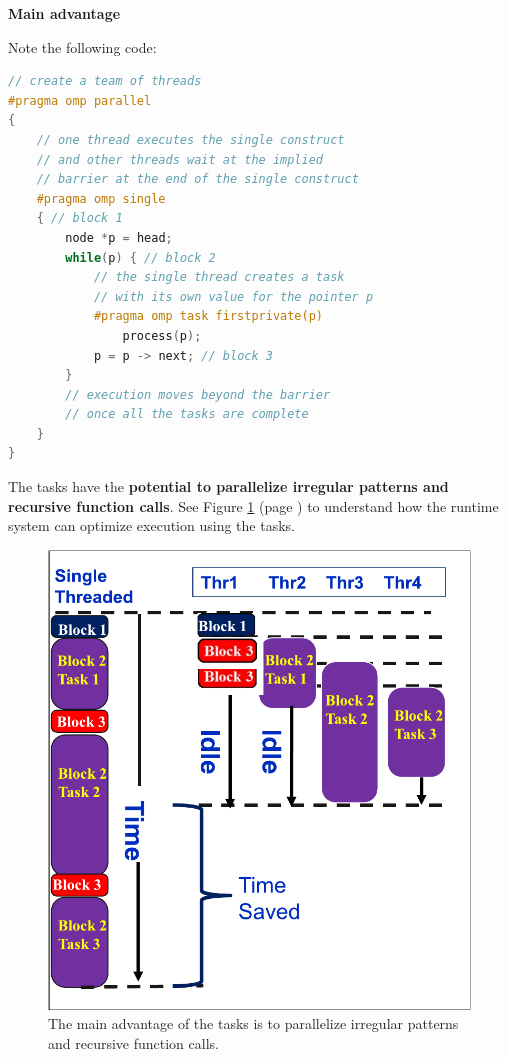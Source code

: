 \begin{flushleft}
    \textcolor{Green3}{ \textbf{Main advantage}}
\end{flushleft}
Note the following code:
\begin{lstlisting}[language=C++]
// create a team of threads
#pragma omp parallel
{
    // one thread executes the single construct
    // and other threads wait at the implied 
    // barrier at the end of the single construct
    #pragma omp single
    { // block 1
        node *p = head;
        while(p) { // block 2
            // the single thread creates a task
            // with its own value for the pointer p
            #pragma omp task firstprivate(p)
                process(p);
            p = p -> next; // block 3
        }
        // execution moves beyond the barrier 
        // once all the tasks are complete
    }
}
\end{lstlisting}
The tasks have the \textbf{potential to parallelize irregular patterns and recursive function calls}. See Figure \ref{figure: openmp tasks 1} (page \pageref{figure: openmp tasks 1}) to understand how the runtime system can optimize execution using the tasks.
\begin{figure}[!htp]
    \centering
    \includegraphics[width=.6\textwidth]{img/openmp-tasks-1.pdf}
    \caption{The main advantage of the tasks is to parallelize irregular patterns and recursive function calls.}
    \label{figure: openmp tasks 1}
\end{figure}